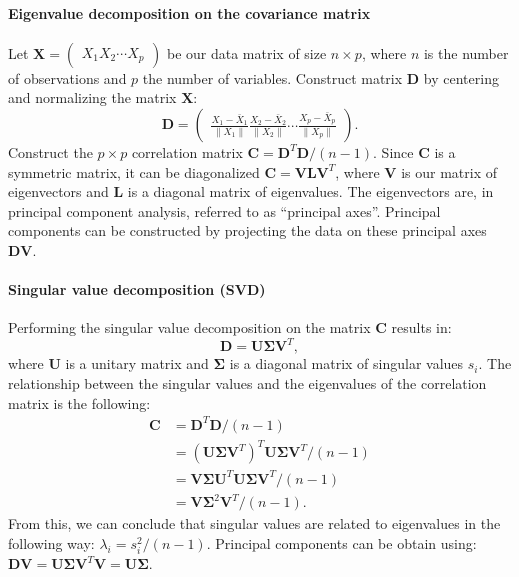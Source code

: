 \paragraph{Eigenvalue decomposition on the covariance matrix}
Let $\mathbf{X} = \begin{pmatrix}X_1 X_2 \cdots X_p \end{pmatrix}$ be our data matrix of size $n \times p$, where $n$ is the number of observations and $p$ the number of variables. Construct matrix $\mathbf{D}$ by centering and normalizing the matrix $\mathbf{X}$:
\begin{equation}
	\mathbf{D} = \begin{pmatrix}
			\frac{X_1 - \bar{X}_1}{\lVert X_1 \rVert} \frac{X_2 - \bar{X}_2}{\lVert X_2 \rVert} \cdots \frac{X_p - \bar{X}_p}{\lVert X_p \rVert} 
		\end{pmatrix}.
\end{equation}
Construct the $p \times p$ correlation matrix $\mathbf{C} = \mathbf{D}^T\mathbf{D} / (n - 1)$. Since $\mathbf{C}$ is a symmetric matrix, it can be diagonalized $\mathbf{C} = \mathbf{V}\mathbf{L}\mathbf{V}^T$, where $\mathbf{V}$ is our matrix of eigenvectors and $\mathbf{L}$ is a diagonal matrix of eigenvalues. The eigenvectors are, in principal component analysis, referred to as \enquote{principal axes}. Principal components can be constructed by projecting the data on these principal axes $\mathbf{D}\mathbf{V}$.

\paragraph{Singular value decomposition (SVD)}
Performing the singular value decomposition on the matrix $\mathbf{C}$ results in:
\begin{equation}
	\mathbf{D} = \mathbf{U}\mathbf{\Sigma}\mathbf{V}^T,
\end{equation}
where $\mathbf{U}$ is a unitary matrix and $\mathbf{\Sigma}$ is a diagonal matrix of singular values $s_i$. The relationship between the singular values and the eigenvalues of the correlation matrix is the following:
\begin{equation}
\begin{aligned}
	\mathbf{C} &= \mathbf{D}^T\mathbf{D} / (n - 1) \\
	&= (\mathbf{U}\mathbf{\Sigma}\mathbf{V}^T)^T\mathbf{U}\mathbf{\Sigma}\mathbf{V}^T / (n - 1) \\
	&= \mathbf{V}\mathbf{\Sigma}\mathbf{U}^T\mathbf{U}\mathbf{\Sigma}\mathbf{V}^T / (n - 1) \\
	&= \mathbf{V}\mathbf{\Sigma}^2\mathbf{V}^T / (n - 1).
\end{aligned}
\end{equation}
From this, we can conclude that singular values are related to eigenvalues in the following way: $\lambda_i = s_i^2 / (n-1)$. Principal components can be obtain using: $\mathbf{D}\mathbf{V} = \mathbf{U}\mathbf{\Sigma}\mathbf{V}^T\mathbf{V} = \mathbf{U}\mathbf{\Sigma}$.

